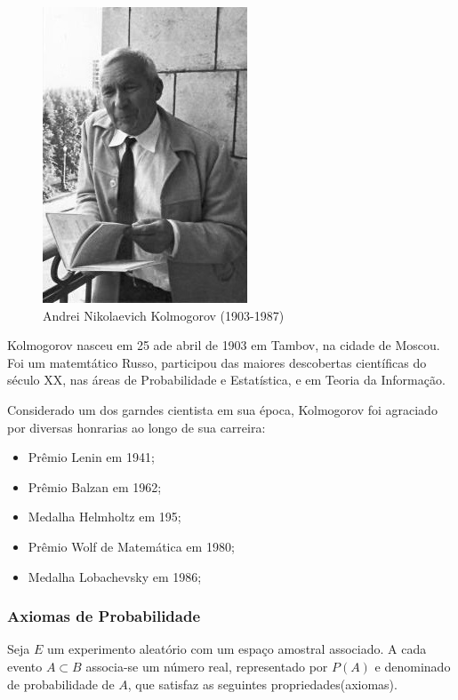 \begin{figure}
    \centering
    \includegraphics[scale=0.5]{figures/Kolmogorov.jpeg}
    \caption{Andrei Nikolaevich Kolmogorov (1903-1987)}
    \label{fig:my_label10}
\end{figure}

Kolmogorov nasceu em 25 ade abril de 1903 em Tambov, na cidade de Moscou. Foi um matemtático Russo, participou das maiores descobertas científicas do século XX, nas áreas de Probabilidade e Estatística, e em Teoria da Informação.\vskip0.3cm

Considerado um dos garndes cientista em sua época, Kolmogorov foi agraciado por diversas honrarias ao longo de sua carreira:

\begin{itemize}
\item Prêmio Lenin em 1941;
\item Prêmio Balzan em 1962;
\item Medalha Helmholtz em 195;
\item Prêmio Wolf de Matemática em 1980;
\item Medalha Lobachevsky em 1986;
\end{itemize}










\newpage
\subsubsection{Axiomas de Probabilidade}

\inic Seja $E$ um experimento aleatório com um espaço amostral associado. A cada evento $A \subset B$ associa-se um número real, representado por $P(A)$ e denominado de probabilidade de $A$, que satisfaz as seguintes propriedades(axiomas).

